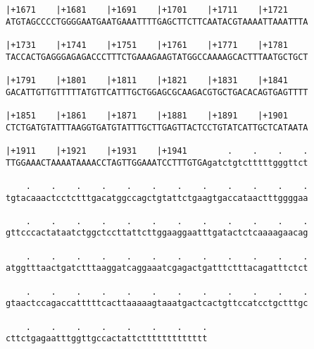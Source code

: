 \documentclass{article}
\begin{document}
\begin{Verbatim}
|+1671    |+1681    |+1691    |+1701    |+1711    |+1721    
ATGTAGCCCCTGGGGAATGAATGAAATTTTGAGCTTCTTCAATACGTAAAATTAAATTTA
                                                            
|+1731    |+1741    |+1751    |+1761    |+1771    |+1781    
TACCACTGAGGGAGAGACCCTTTCTGAAAGAAGTATGGCCAAAAGCACTTTAATGCTGCT
                                                            
|+1791    |+1801    |+1811    |+1821    |+1831    |+1841    
GACATTGTTGTTTTTATGTTCATTTGCTGGAGCGCAAGACGTGCTGACACAGTGAGTTTT
                                                            
|+1851    |+1861    |+1871    |+1881    |+1891    |+1901    
CTCTGATGTATTTAAGGTGATGTATTTGCTTGAGTTACTCCTGTATCATTGCTCATAATA
                                                            
|+1911    |+1921    |+1931    |+1941        .    .    .    .
TTGGAAACTAAAATAAAACCTAGTTGGAAATCCTTTGTGAgatctgtctttttgggttct
                                                            
    .    .    .    .    .    .    .    .    .    .    .    .
tgtacaaactcctctttgacatggccagctgtattctgaagtgaccataactttggggaa
                                                            
    .    .    .    .    .    .    .    .    .    .    .    .
gttcccactataatctggctccttattcttggaaggaatttgatactctcaaaagaacag
                                                            
    .    .    .    .    .    .    .    .    .    .    .    .
atggtttaactgatctttaaggatcaggaaatcgagactgatttctttacagatttctct
                                                            
    .    .    .    .    .    .    .    .    .    .    .    .
gtaactccagaccatttttcacttaaaaagtaaatgactcactgttccatcctgctttgc
                                                            
    .    .    .    .    .    .    .    .
cttctgagaatttggttgccactattcttttttttttttt
                                        
                                        
\end{Verbatim}
\end{document}
